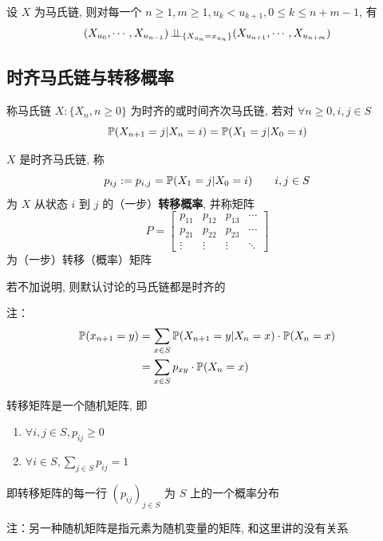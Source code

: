 \begin{corollary}
    设 $X$ 为马氏链, 则对每一个 $n\geq 1,m\geq 1, u_k<u_{k+1}, 0\leq k\leq n+m-1$, 有
    \[
    (X_{u_0},\cdots,X_{u_{n-1}})\operatorname{\perp\!\!\!\perp}_{\{X_{u_n}=x_{u_n}\}}(X_{u_{n+1}},\cdots,X_{u_{n+m}})
    \]
\end{corollary}

\newpage
\subsection{时齐马氏链与转移概率}

\begin{definition}[时间齐次马氏链]
    称马氏链 $X:\{X_n,n\geq 0\}$ 为时齐的或时间齐次马氏链, 若对 $\forall n\geq 0, i,j\in S$
    \[
    \mathbb{P}(X_{n+1}=j|X_n=i)=\mathbb{P}(X_1=j|X_0=i)
    \]
\end{definition}

\begin{definition}
    $X$ 是时齐马氏链, 称
    \[
    p_{ij}:=p_{i,j}=\mathbb{P}(X_1=j|X_0=i)\qquad i,j\in S
    \]
    为 $X$ 从状态 $i$ 到 $j$ 的（一步）\textbf{转移概率}, 并称矩阵
    \[
    P=\begin{bmatrix}
        p_{11} & p_{12} & p_{13} & \cdots\\
        p_{21} & p_{22} & p_{23} & \cdots\\
        \vdots & \vdots & \vdots & \ddots
    \end{bmatrix}
    \]
    为（一步）转移（概率）矩阵
\end{definition}

若不加说明, 则默认讨论的马氏链都是时齐的

注：
\[
\begin{aligned}
    \mathbb{P}(x_{n+1}=y)&=\sum_{x\in S}\mathbb{P}(X_{n+1}=y|X_n=x)\cdot \mathbb{P}(X_n=x)\\
    &=\sum_{x\in S}p_{xy}\cdot \mathbb{P}(X_n=x)
\end{aligned}
\]

\begin{theorem}[转移矩阵的刻画]\label{thm:random_matrix}
    转移矩阵是一个随机矩阵, 即
    \begin{enumerate}
        \item $\forall i,j\in S,p_{ij}\geq 0$
        \item $\forall i\in S,\sum_{j\in S}p_{ij}=1$
    \end{enumerate}
    即转移矩阵的每一行 $(p_{ij})_{j\in S}$ 为 $S$ 上的一个概率分布

    注：另一种随机矩阵是指元素为随机变量的矩阵, 和这里讲的没有关系
\end{theorem}

